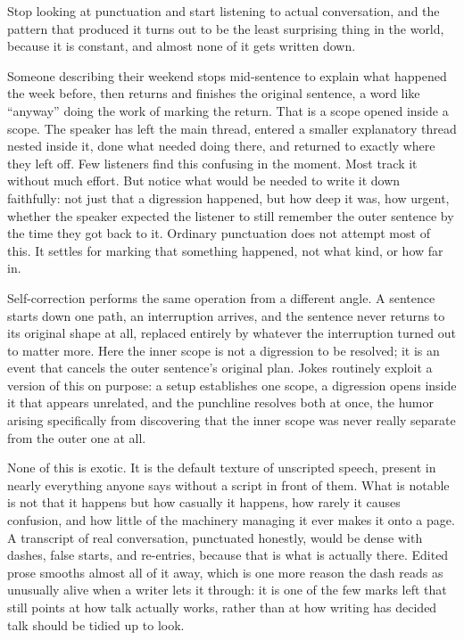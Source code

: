 \documentclass[11pt]{article}
\begin{document}
Stop looking at punctuation and start listening to actual conversation, and the pattern that produced it turns out to be the least surprising thing in the world, because it is constant, and almost none of it gets written down.

Someone describing their weekend stops mid-sentence to explain what happened the week before, then returns and finishes the original sentence, a word like ``anyway'' doing the work of marking the return. That is a scope opened inside a scope. The speaker has left the main thread, entered a smaller explanatory thread nested inside it, done what needed doing there, and returned to exactly where they left off. Few listeners find this confusing in the moment. Most track it without much effort. But notice what would be needed to write it down faithfully: not just that a digression happened, but how deep it was, how urgent, whether the speaker expected the listener to still remember the outer sentence by the time they got back to it. Ordinary punctuation does not attempt most of this. It settles for marking that something happened, not what kind, or how far in.

Self-correction performs the same operation from a different angle. A sentence starts down one path, an interruption arrives, and the sentence never returns to its original shape at all, replaced entirely by whatever the interruption turned out to matter more. Here the inner scope is not a digression to be resolved; it is an event that cancels the outer sentence's original plan. Jokes routinely exploit a version of this on purpose: a setup establishes one scope, a digression opens inside it that appears unrelated, and the punchline resolves both at once, the humor arising specifically from discovering that the inner scope was never really separate from the outer one at all.

None of this is exotic. It is the default texture of unscripted speech, present in nearly everything anyone says without a script in front of them. What is notable is not that it happens but how casually it happens, how rarely it causes confusion, and how little of the machinery managing it ever makes it onto a page. A transcript of real conversation, punctuated honestly, would be dense with dashes, false starts, and re-entries, because that is what is actually there. Edited prose smooths almost all of it away, which is one more reason the dash reads as unusually alive when a writer lets it through: it is one of the few marks left that still points at how talk actually works, rather than at how writing has decided talk should be tidied up to look.
\end{document}
